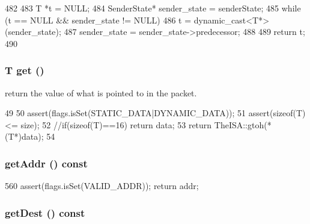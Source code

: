 \begin{DoxyCode}
482     {
483         T *t = NULL;
484         SenderState* sender_state = senderState;
485         while (t == NULL && sender_state != NULL) {
486             t = dynamic_cast<T*>(sender_state);
487             sender_state = sender_state->predecessor;
488         }
489         return t;
490     }
\end{DoxyCode}
\hypertarget{classPacket_af6ea056c8af82f08af9fd0d857967f9b}{
\subsubsection[{get}]{\setlength{\rightskip}{0pt plus 5cm}T get ()}}
\label{classPacket_af6ea056c8af82f08af9fd0d857967f9b}
return the value of what is pointed to in the packet. 


\begin{DoxyCode}
49 {
50     assert(flags.isSet(STATIC_DATA|DYNAMIC_DATA));
51     assert(sizeof(T) <= size);
52     //if(sizeof(T)==16) {return data;}
53     return TheISA::gtoh(*(T*)data);
54 }
\end{DoxyCode}
\hypertarget{classPacket_afca9af4d83a57836baba87603463a6e0}{
\subsubsection[{getAddr}]{ getAddr () const}}
\label{classPacket_afca9af4d83a57836baba87603463a6e0}



\begin{DoxyCode}
560 { assert(flags.isSet(VALID_ADDR)); return addr; }
\end{DoxyCode}
\hypertarget{classPacket_a8c4564a96830dffcc13f56b716afa674}{
\subsubsection[{getDest}]{ getDest () const}}
\label{classPacket_a8c4564a96830dffcc13f56b716afa674}


